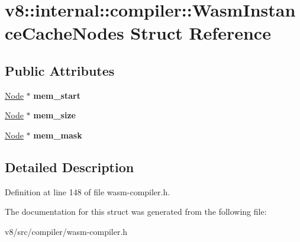 \hypertarget{structv8_1_1internal_1_1compiler_1_1WasmInstanceCacheNodes}{}\section{v8\+:\+:internal\+:\+:compiler\+:\+:Wasm\+Instance\+Cache\+Nodes Struct Reference}
\label{structv8_1_1internal_1_1compiler_1_1WasmInstanceCacheNodes}
\subsection*{Public Attributes}
\begin{DoxyCompactItemize}
\item 
\mbox{\label{structv8_1_1internal_1_1compiler_1_1WasmInstanceCacheNodes_a51cd66aaf1434c836ab244a4271d54f0}} 
\mbox{\hyperlink{classv8_1_1internal_1_1compiler_1_1Node}{Node}} $\ast$ {\bfseries mem\+\_\+start}
\item 
\mbox{\label{structv8_1_1internal_1_1compiler_1_1WasmInstanceCacheNodes_a9af058bf1a9e5854cdfe870ba759bfac}} 
\mbox{\hyperlink{classv8_1_1internal_1_1compiler_1_1Node}{Node}} $\ast$ {\bfseries mem\+\_\+size}
\item 
\mbox{\label{structv8_1_1internal_1_1compiler_1_1WasmInstanceCacheNodes_a2dd61269d1e5a8bb1f55c0ca18fe579e}} 
\mbox{\hyperlink{classv8_1_1internal_1_1compiler_1_1Node}{Node}} $\ast$ {\bfseries mem\+\_\+mask}
\end{DoxyCompactItemize}


\subsection{Detailed Description}


Definition at line 148 of file wasm-\/compiler.\+h.



The documentation for this struct was generated from the following file\+:\begin{DoxyCompactItemize}
\item 
v8/src/compiler/wasm-\/compiler.\+h\end{DoxyCompactItemize}
